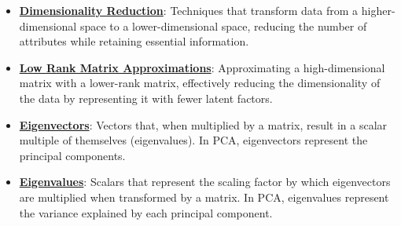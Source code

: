 \documentclass{article}%
\begin{document}
\begin{itemize}[leftmargin=*]
\item \href{https://purdue.brightspace.com/d2l/common/assets/pdfjs-d2l-dist/1.0.14-legacy/web/viewer.html?file=\%2Fcontent\%2Fenforced\%2F1095467-wl.202510.CS.24300.001\%2F11L2-svd-pca-recommender.pdf\%3Fou\%3D1095467\&lang=en-us\&container=d2l-fileviewer-rendered-pdf\&fullscreen=d2l-fileviewer-rendered-pdf-dialog\&height=667#page=8}{\textbf{Dimensionality Reduction}}: Techniques that transform data from a higher-dimensional space to a lower-dimensional space, reducing the number of attributes while retaining essential information.%
\item \href{https://purdue.brightspace.com/d2l/common/assets/pdfjs-d2l-dist/1.0.14-legacy/web/viewer.html?file=\%2Fcontent\%2Fenforced\%2F1095467-wl.202510.CS.24300.001\%2F11L2-svd-pca-recommender.pdf\%3Fou\%3D1095467\&lang=en-us\&container=d2l-fileviewer-rendered-pdf\&fullscreen=d2l-fileviewer-rendered-pdf-dialog\&height=667#page=9}{\textbf{Low Rank Matrix Approximations}}: Approximating a high-dimensional matrix with a lower-rank matrix, effectively reducing the dimensionality of the data by representing it with fewer latent factors.%
\item \href{https://purdue.brightspace.com/d2l/common/assets/pdfjs-d2l-dist/1.0.14-legacy/web/viewer.html?file=\%2Fcontent\%2Fenforced\%2F1095467-wl.202510.CS.24300.001\%2F11L2-svd-pca-recommender.pdf\%3Fou\%3D1095467\&lang=en-us\&container=d2l-fileviewer-rendered-pdf\&fullscreen=d2l-fileviewer-rendered-pdf-dialog\&height=667#page=17}{\textbf{Eigenvectors}}: Vectors that, when multiplied by a matrix, result in a scalar multiple of themselves (eigenvalues). In PCA, eigenvectors represent the principal components.%
\item \href{https://purdue.brightspace.com/d2l/common/assets/pdfjs-d2l-dist/1.0.14-legacy/web/viewer.html?file=\%2Fcontent\%2Fenforced\%2F1095467-wl.202510.CS.24300.001\%2F11L2-svd-pca-recommender.pdf\%3Fou\%3D1095467\&lang=en-us\&container=d2l-fileviewer-rendered-pdf\&fullscreen=d2l-fileviewer-rendered-pdf-dialog\&height=667#page=17}{\textbf{Eigenvalues}}: Scalars that represent the scaling factor by which eigenvectors are multiplied when transformed by a matrix. In PCA, eigenvalues represent the variance explained by each principal component.%
\end{itemize}

%
\end{document}

